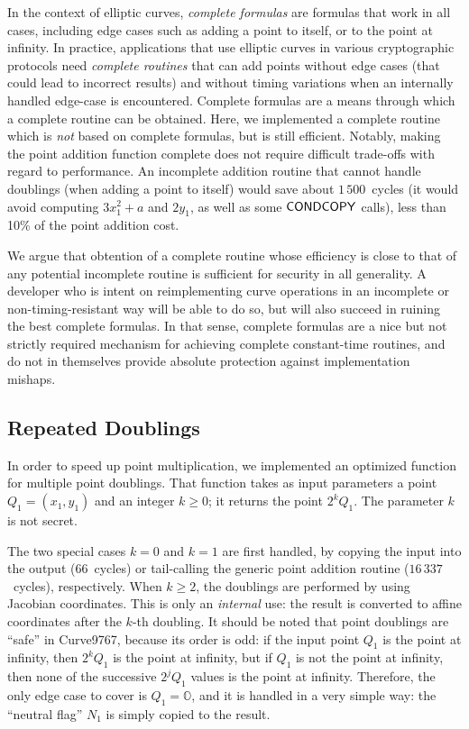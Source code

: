 \documentclass{llncs}
\newcommand{\neutral}{\mathbb{O}}
\begin{document}
In the context of elliptic curves, \emph{complete formulas} are formulas
that work in all cases, including edge cases such as adding a point to
itself, or to the point at infinity. In practice, applications that use
elliptic curves in various cryptographic protocols need \emph{complete
routines} that can add points without edge cases (that could lead to
incorrect results) and without timing variations when an internally
handled edge-case is encountered. Complete formulas are a means through
which a complete routine can be obtained. Here, we implemented a
complete routine which is \emph{not} based on complete formulas, but is
still efficient. Notably, making the point addition function complete
does not require difficult trade-offs with regard to performance. An
incomplete addition routine that cannot handle doublings (when adding a
point to itself) would save about $1\,500$~cycles (it would avoid
computing $3x_1^2+a$ and $2y_1$, as well as some
$\text{\textsf{CONDCOPY}}$ calls), less than 10\% of the point addition
cost.

We argue that obtention of a complete routine whose efficiency is close
to that of any potential incomplete routine is sufficient for security
in all generality. A developer who is intent on reimplementing curve
operations in an incomplete or non-timing-resistant way will be able to
do so, but will also succeed in ruining the best complete formulas. In
that sense, complete formulas are a nice but not strictly required
mechanism for achieving complete constant-time routines, and do not in
themselves provide absolute protection against implementation mishaps.

\subsection{Repeated Doublings}\label{sec:curve9767:doublings}

In order to speed up point multiplication, we implemented an optimized
function for multiple point doublings. That function takes as input
parameters a point $Q_1 = (x_1,y_1)$ and an integer $k \geq 0$; it
returns the point $2^k Q_1$. The parameter $k$ is not secret.

The two special cases $k = 0$ and $k = 1$ are first handled, by copying
the input into the output (66~cycles) or tail-calling the generic point
addition routine ($16\,337$~cycles), respectively. When $k\geq 2$, the
doublings are performed by using Jacobian coordinates. This is only an
\emph{internal} use: the result is converted to affine coordinates after
the $k$-th doubling. It should be noted that point doublings are
``safe'' in Curve9767, because its order is odd: if the input point
$Q_1$ is the point at infinity, then $2^k Q_1$ is the point at infinity,
but if $Q_1$ is not the point at infinity, then none of the successive
$2^j Q_1$ values is the point at infinity. Therefore, the only edge case
to cover is $Q_1 = \neutral$, and it is handled in a very simple way:
the ``neutral flag'' $N_1$ is simply copied to the result.
\end{document}
